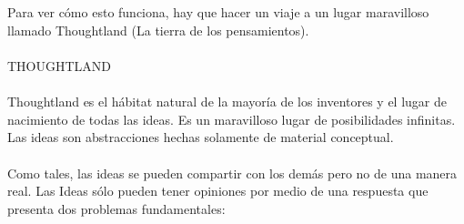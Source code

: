 \documentclass{article}
\begin{document}
\\ \\
Para ver c\'omo esto funciona, hay que hacer un viaje a un lugar maravilloso llamado Thoughtland (La tierra de los pensamientos).
\\ \\
THOUGHTLAND
\\ \\
Thoughtland es el h\'abitat natural de la mayor\'ia de los inventores y el lugar de nacimiento de todas las ideas. Es un maravilloso lugar de posibilidades infinitas. Las ideas son abstracciones hechas solamente de material conceptual.
\\ \\
Como tales, las ideas se pueden compartir con los dem\'as pero no de una manera real. Las Ideas s\'olo pueden tener opiniones por medio de una respuesta que presenta dos problemas fundamentales:
\end{document}
